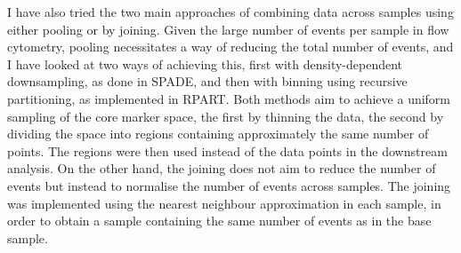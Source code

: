 I have also tried the two main approaches of combining data across samples using either pooling or by joining.
Given the large number of events per sample in flow cytometry, pooling necessitates a way of reducing the total number of events,
and I have looked at two ways of achieving this, first with density-dependent downsampling, as done in SPADE, and then with binning
using recursive partitioning, as implemented in RPART.
Both methods aim to achieve a uniform sampling of the core marker space, the first by thinning the data, the second
by dividing the space into regions containing approximately the same number of points.
The regions were then used instead of the data points in the downstream analysis.
On the other hand, the joining does not aim to reduce the number of events but instead to normalise the number of events
across samples.
The joining was implemented using the nearest neighbour approximation in each sample, in order to obtain a sample
containing the same number of events as in the base sample.

